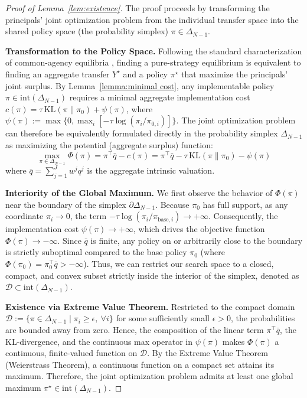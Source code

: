 \documentclass{article}
\begin{document}
\begin{proof}[Proof of Lemma~\ref{lem:existence}]
The proof proceeds by transforming the principals' joint optimization problem from the individual transfer space into the shared policy space (the probability simplex) $\pi \in \Delta_{N-1}$.

\textbf{Transformation to the Policy Space.}
Following the standard characterization of common-agency equilibria \citep{bernheim1986common}, finding a pure-strategy equilibrium is equivalent to finding an aggregate transfer $Y^\star$ and a policy $\pi^\star$ that maximize the principals' joint surplus. By Lemma~\ref{lemma:minimal cost}, any implementable policy $\pi \in \mathrm{int}(\Delta_{N-1})$ requires a minimal aggregate implementation cost $c(\pi) = \tau\,\mathrm{KL}(\pi\|\pi_0) + \psi(\pi)$, where $\psi(\pi) := \max\{0, \max_{i} [-\tau \log(\pi_i/\pi_{0,i})]\}$. The joint optimization problem can therefore be equivalently formulated directly in the probability simplex $\Delta_{N-1}$ as maximizing the potential (aggregate surplus) function:
\begin{equation}
    \max_{\pi \in \Delta_{N-1}} \Phi(\pi) = \pi^\top \bar{q} - c(\pi) = \pi^\top \bar{q} - \tau\,\mathrm{KL}(\pi\|\pi_0) - \psi(\pi)
\end{equation}
where $\bar{q} = \sum_{j=1}^J w^jq^j$ is the aggregate intrinsic valuation.

\textbf{Interiority of the Global Maximum.}
We first observe the behavior of $\Phi(\pi)$ near the boundary of the simplex $\partial\Delta_{N-1}$. Because $\pi_0$ has full support, as any coordinate $\pi_i \to 0$, the term $-\tau \log(\pi_i/\pi_{\mathrm{base},i}) \to +\infty$. Consequently, the implementation cost $\psi(\pi) \to +\infty$, which drives the objective function $\Phi(\pi) \to -\infty$. Since $\bar{q}$ is finite, any policy on or arbitrarily close to the boundary is strictly suboptimal compared to the base policy $\pi_0$ (where $\Phi(\pi_0) = \pi_0^\top \bar{q} > -\infty$). Thus, we can restrict our search space to a closed, compact, and convex subset strictly inside the interior of the simplex, denoted as $\mathcal{D} \subset \mathrm{int}(\Delta_{N-1})$.

\textbf{Existence via Extreme Value Theorem.}
Restricted to the compact domain $\mathcal{D} := \{\pi \in \Delta_{N-1} \mid \pi_i \ge \epsilon, \ \forall i\}$ for some sufficiently small $\epsilon > 0$, the probabilities are bounded away from zero. Hence, the composition of the linear term $\pi^\top \bar{q}$, the KL-divergence, and the continuous max operator in $\psi(\pi)$ makes $\Phi(\pi)$ a continuous, finite-valued function on $\mathcal{D}$. By the Extreme Value Theorem (Weierstrass Theorem), a continuous function on a compact set attains its maximum. Therefore, the joint optimization problem admits at least one global maximum $\pi^\star \in \mathrm{int}(\Delta_{N-1})$.


\end{proof}
\end{document}
